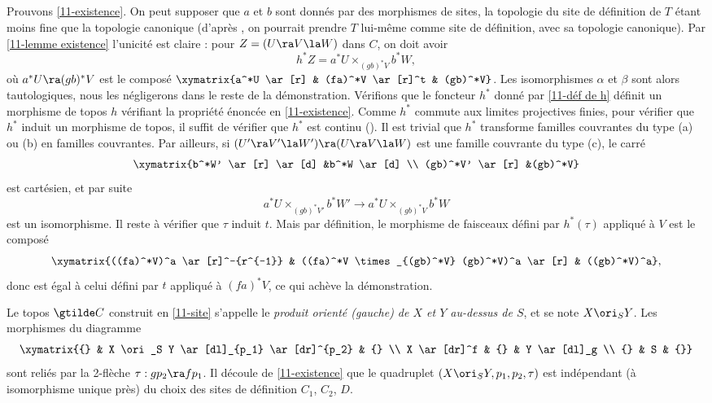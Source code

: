 \documentclass[10pt]{../fichiers-configuration-latex/smfart}
\begin{document}
\subsection{}\label{11-preuve du th.}
Prouvons \ref{11-existence}. On peut supposer que $a$ et $b$ sont donnés par des morphismes de
sites, la topologie du site de définition de $T$ étant moins fine que la topologie canonique
(d'après , on pourrait prendre $T$ lui-même comme site de définition, avec sa
topologie canonique). Par \ref{11-lemme existence} l'unicité est claire : pour $Z = (U \ra V \la W)$
dans $C$, on doit avoir
\begin{equation}
h^*Z = a^*U \times_{(gb)^*V}b^*W, \label{11-déf de h}
\end{equation}
où $a^*U \ra (gb)^*V$ est le composé $\xymatrix{a^*U \ar[r] & (fa)^*V \ar[r]^t &
(gb)^*V}$. Les isomorphismes $\alpha$ et $\beta$ sont alors tautologiques, nous les négligerons dans
le reste de la démonstration. Vérifions que le foncteur $h^*$ donné par \ref{11-déf de h} définit un
morphisme de topos $h$ vérifiant la propriété énoncée en \ref{11-existence}. Comme $h^*$ commute aux
limites projectives finies, pour vérifier que $h^*$ induit un morphisme de topos, il suffit de
vérifier que $h^*$ est continu (). Il est trivial que $h^*$ transforme
familles couvrantes du type (a) ou (b) en familles couvrantes. Par ailleurs, si $(U' \ra V' \la W')
\ra (U \ra V \la W)$ est une famille couvrante du type (c), le carré $$ \xymatrix {b^*W' \ar[r]
\ar[d] &b^*W \ar[d]  \\ (gb)^*V' \ar[r] &(gb)^*V} $$ est cartésien, et par suite $$ a^*U
\times_{(gb)^*V'} b^*W' \rightarrow a^*U \times_{(gb)^*V} b^*W $$ est un isomorphisme. Il reste à
vérifier que $\tau$ induit $t$. Mais par définition, le morphisme de faisceaux défini par
$h^*(\tau)$ appliqué à $V$ est le composé $$ \xymatrix{((fa)^*V)^a \ar[r]^-{r^{-1}} & ((fa)^*V
\times_{(gb)^*V} (gb)^*V)^a \ar[r] & ((gb)^*V)^a}, $$ donc est égal à celui défini par $t$ appliqué
à $(fa)^*V$, ce qui achève la démonstration. 

\begin{definition}
\label{11-produit orienté} Le topos
$\gtilde C$ construit en \ref{11-site} s'appelle le \textit{produit orienté (gauche) de $X$ et $Y$
au-dessus de $S$}, et se note $X \ori_S Y$.  Les morphismes du diagramme $$ \xymatrix{{} & X \ori_S
Y \ar[dl]_{p_1} \ar[dr]^{p_2} & {} \\ X \ar[dr]^f  & {} & Y \ar[dl]_g \\ {} & S & {}} $$ sont reliés
par la 2-flèche $\tau : gp_2 \ra fp_1$. Il découle de \ref{11-existence} que le quadruplet $(X
\ori_S Y, p_1,p_2,\tau)$ est indépendant (à isomorphisme unique près) du choix des sites de
définition $C_1$, $C_2$, $D$.
\end{definition}
\end{document}
